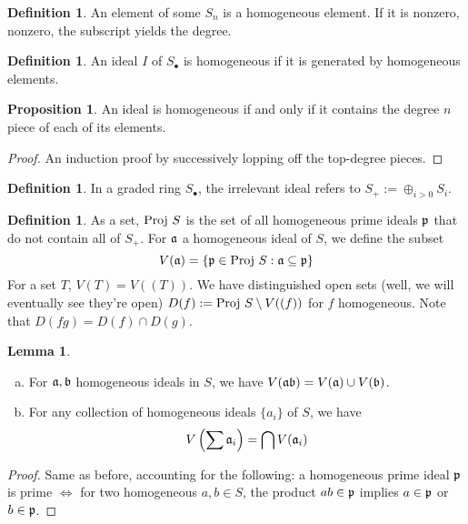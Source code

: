 \documentclass[10pt,reqno]{amsart}
\theoremstyle{definition}
\newtheorem{definition}[theorem]{Definition}
\newtheorem{proposition}[theorem]{Proposition}
\newtheorem{lemma}[theorem]{Lemma}
\theoremstyle{remark}
\numberwithin{equation}{section}
\numberwithin{theorem}{section}
\newcommand{\fraka}{\frak{a}}
\newcommand{\frakb}{\frak{b}}
\newcommand{\proj}{\textup{Proj }}
\newcommand{\pp}{\frak{p}}
\begin{document}
\begin{definition} An element of some $S_n$ is a homogeneous element. If it is nonzero, nonzero, the subscript yields the degree.
\end{definition}

\begin{definition} An ideal $I$ of $S_{\bullet}$ is homogeneous if it is generated by homogeneous elements.
\end{definition}

\begin{proposition} An ideal is homogeneous if and only if it contains the degree $n$ piece of each of its elements.
\end{proposition}
\begin{proof}An induction proof by successively lopping off the top-degree pieces.
\end{proof}

\begin{definition} In a graded ring $S_{\bullet}$, the irrelevant ideal refers to $S_+ := \oplus_{i > 0} S_i$.
\end{definition}

\begin{definition} As a set, $\proj S$ is the set of all homogeneous prime ideals $\pp$ that do not contain all of $S_+$. For $\fraka$ a homogeneous ideal of $S$, we define the subset 
\[V(\fraka) = \{\pp \in \proj S: \fraka \subseteq \pp\}\]
For a set $T$, $V(T) = V((T))$. We have distinguished open sets (well, we will eventually see they're open) $D(f) := \proj S \setminus V((f))$ for $f$ homogeneous. Note that $D(fg) = D(f) \cap D(g)$.
\end{definition}

\begin{lemma} \text{ }
\begin{enumerate}[(a)]
\item For $\fraka, \frakb$ homogeneous ideals in $S$, we have $V(\fraka \frakb) = V(\fraka) \cup V(\frakb)$.
\item For any collection of homogeneous ideals $\{a_i\}$ of $S$, we have
\[V\left(\sum \fraka_i \right) = \bigcap V(\fraka_i)\]
\end{enumerate}
\end{lemma}
\begin{proof}
Same as before, accounting for the following: a homogeneous prime ideal $\pp$ is prime $\iff$ for two homogeneous $a,b \in S$, the product $ab \in \pp$ implies $a \in \pp$ or $b \in \pp$.
\end{proof}
\end{document}
